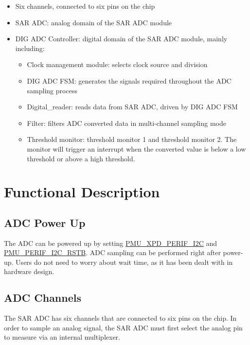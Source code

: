 \documentclass[main\_\_EN.tex]{subfiles}
\begin{document}
\begin{itemize}
    \item Six channels, connected to six pins on the chip
    \item SAR ADC: analog domain of the SAR ADC module
    \item DIG ADC Controller: digital domain of the SAR ADC module, mainly including:
       \begin{itemize}
            \item Clock management module: selects clock source and division
            \item DIG ADC FSM: generates the signals required throughout the ADC sampling process
            \item Digital\_reader: reads data from SAR ADC, driven by DIG ADC FSM
            \item Filter: filters ADC converted data in multi-channel sampling mode
            \item Threshold monitor: threshold monitor 1 and threshold monitor 2. The monitor will trigger an interrupt when the converted value is below a low threshold or above a high threshold.
        \end{itemize}
\end{itemize}



\section{Functional Description}
\label{sec:sar-adc-func-descr}

\subsection{ADC Power Up}
\label{sec:sar-adc-power-up}

The ADC can be powered up by setting \hyperref[fielddesc:PMUXPDPERIFI2C]{PMU\_XPD\_PERIF\_I2C} and \hyperref[fielddesc:PMUPERIFI2CRSTB]{PMU\_PERIF\_I2C\_RSTB}. ADC sampling can be performed right after power-up. Users do not need to worry about wait time, as it has been dealt with in hardware design.
\subsection{ADC Channels}
\label{sec:sar-adc-channels}

The SAR ADC has six channels that are connected to six pins on the chip. In order to sample an analog signal, the SAR ADC must first select the analog pin to measure via an internal multiplexer.
\end{document}
